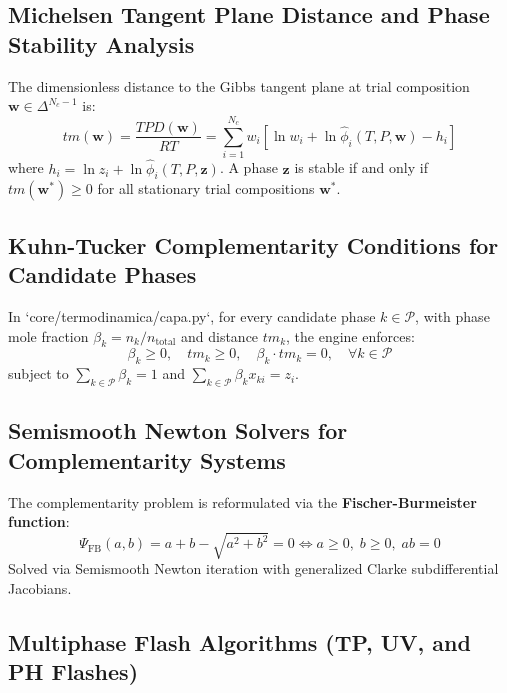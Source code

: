 \documentclass[11pt,a4paper]{article}
\begin{document}
\subsection{Michelsen Tangent Plane Distance and Phase Stability Analysis}

The dimensionless distance to the Gibbs tangent plane at trial composition $\mathbf{w} \in \Delta^{N_c-1}$ is:
\begin{equation}
tm(\mathbf{w}) = \frac{TPD(\mathbf{w})}{RT} = \sum_{i=1}^{N_c} w_i \left[ \ln w_i + \ln \hat{\phi}_i(T, P, \mathbf{w}) - h_i \right]
\end{equation}
where $h_i = \ln z_i + \ln \hat{\phi}_i(T, P, \mathbf{z})$.
A phase $\mathbf{z}$ is stable if and only if $tm(\mathbf{w}^*) \ge 0$ for all stationary trial compositions $\mathbf{w}^*$.

\subsection{Kuhn-Tucker Complementarity Conditions for Candidate Phases}

In `core/termodinamica/capa.py`, for every candidate phase $k \in \mathcal{P}$, with phase mole fraction $\beta_k = n_k / n_{\text{total}}$ and distance $tm_k$, the engine enforces:
\begin{equation}
\beta_k \ge 0, \quad tm_k \ge 0, \quad \beta_k \cdot tm_k = 0, \quad \forall k \in \mathcal{P}
\end{equation}
subject to $\sum_{k \in \mathcal{P}} \beta_k = 1$ and $\sum_{k \in \mathcal{P}} \beta_k x_{ki} = z_i$.

\subsection{Semismooth Newton Solvers for Complementarity Systems}

The complementarity problem is reformulated via the \textbf{Fischer-Burmeister function}:
\begin{equation}
\Psi_{\text{FB}}(a, b) = a + b - \sqrt{a^2 + b^2} = 0 \iff a \ge 0, \; b \ge 0, \; ab = 0
\end{equation}
Solved via Semismooth Newton iteration with generalized Clarke subdifferential Jacobians.

\subsection{Multiphase Flash Algorithms (TP, UV, and PH Flashes)}
\end{document}
